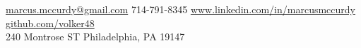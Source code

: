 \documentclass[10pt,a4paper]{article}
\begin{document}
\sloppy  %


\nobreakvspace{0.3em}  %

\noindent\href{mailto:marcus.mccurdy@gmail.com}
{marcus.mccurdy\mbox{}@\mbox{}gmail.com}\sbull
{}714-791-8345\sbull
\href{http://www.linkedin.com/in/marcusmccurdy}
    {www.linkedin.com/in/marcusmccurdy}
\href{http://github.com/volker48}{github.com/volker48}
\\
240 Montrose ST\sbull
Philadelphia, PA 19147\sbull

\spacedhrule{0.9em}{-0.4em}  %
\end{document}
